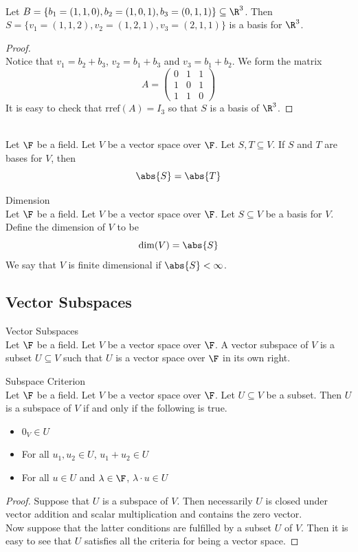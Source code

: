 \documentclass[a4paper]{article}
\begin{document}
\begin{eg}{}{}\\
Let $B=\{b_1=(1,1,0),b_2=(1,0,1),b_3=(0,1,1)\}\subseteq\R^3$. Then $S=\{v_1=(1,1,2),v_2=(1,2,1),v_3=(2,1,1)\}$ is a basis for $\R^3$. 
\begin{proof}\\
Notice that $v_1=b_2+b_3$, $v_2=b_1+b_3$ and $v_3=b_1+b_2$. We form the matrix $$A=\begin{pmatrix}
0 & 1 & 1\\
1 & 0 & 1\\
1 & 1 & 0
\end{pmatrix}$$ It is easy to check that $\text{rref}(A)=I_3$ so that $S$ is a basis of $\R^3$. 
\end{proof}
\end{eg}

\begin{prp}{}{}\\
Let $\F$ be a field. Let $V$ be a vector space over $\F$. Let $S,T\subseteq V$. If $S$ and $T$ are bases for $V$, then $$\abs{S}=\abs{T}$$
\end{prp}

\begin{defn}{Dimension}{}\\
Let $\F$ be a field. Let $V$ be a vector space over $\F$. Let $S\subseteq V$ be a basis for $V$. Define the dimension of $V$ to be $$\dim(V)=\abs{S}$$ We say that $V$ is finite dimensional if $\abs{S}<\infty$. 
\end{defn}

\subsection{Vector Subspaces}
\begin{defn}{Vector Subspaces}{}\\
Let $\F$ be a field. Let $V$ be a vector space over $\F$. A vector subspace of $V$ is a subset $U\subseteq V$ such that $U$ is a vector space over $\F$ in its own right. 
\end{defn}

\begin{prp}{Subspace Criterion}{}\\
Let $\F$ be a field. Let $V$ be a vector space over $\F$. Let $U\subseteq V$ be a subset. Then $U$ is a subspace of $V$ if and only if the following is true. 
\begin{itemize}
\item $0_V\in U$
\item For all $u_1,u_2\in U$, $u_1+u_2\in U$
\item For all $u\in U$ and $\lambda\in\F$, $\lambda\cdot u\in U$
\end{itemize} 
\begin{proof}
Suppose that $U$ is a subspace of $V$. Then necessarily $U$ is closed under vector addition and scalar multiplication and contains the zero vector. \\
Now suppose that the latter conditions are fulfilled by a subset $U$ of $V$. Then it is easy to see that $U$ satisfies all the criteria for being a vector space. 
\end{proof}
\end{prp}
\end{document}
